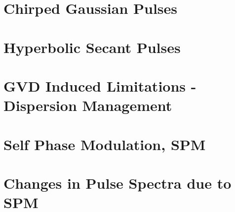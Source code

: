 \documentclass[colorlinks,11pt,a4paper,normalphoto,withhyper,ragged2e]{altareport}
\begin{document}
\pagebreak




\section{Chirped Gaussian Pulses}



\section{Hyperbolic Secant Pulses}



\section{GVD Induced Limitations - Dispersion Management}



\section{Self Phase Modulation, SPM}



\section{Changes in Pulse Spectra due to SPM}







\newpage
{}  %


\end{document}
